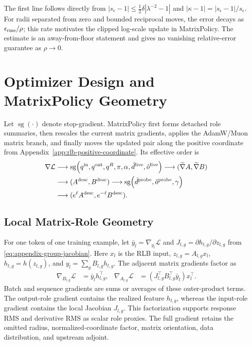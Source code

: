 \documentclass{article}
\begin{document}
The first line follows directly from
$|s_\epsilon-1|\le\tfrac12\delta|\lambda^{-2}-1|$ and
$|\kappa-1|=|s_\epsilon-1|/s_\epsilon$.  For radii separated from zero and
bounded reciprocal moves, the error decays as $\epsilon_{\rm rms}/\rho$; this
rate motivates the clipped log-scale update in MatrixPolicy.  The estimate is
an away-from-floor statement and gives no vanishing relative-error guarantee as
$\rho\to0$.

\section{Optimizer Design and MatrixPolicy Geometry}
\label{app:matrixpolicy-step}

Let $\operatorname{sg}(\cdot)$ denote stop-gradient.  MatrixPolicy first forms
detached role summaries, then rescales the current matrix gradients, applies the
AdamW/Muon matrix branch, and finally moves the updated pair along the positive
coordinate from Appendix~\ref{app:rlb-positive-coordinate}.  Its effective
order is
\begin{equation}
\begin{aligned}
    \nabla\mathcal L
    &\longrightarrow
    \operatorname{sg}\!\left(
    q^{\rm in},q^{\rm out},q^R,\pi,\alpha,
    \hat d^{\rm live},\hat o^{\rm live}
    \right)
    \longrightarrow
    (\widetilde\nabla A,\widetilde\nabla B)
    \\
    &\longrightarrow
    (A^{\rm desc},B^{\rm desc})
    \longrightarrow
    \operatorname{sg}\!\left(
    \hat d^{\rm probe},\hat o^{\rm probe},\gamma
    \right)
    \\
    &\longrightarrow
    (e^\ell A^{\rm desc},e^{-\ell}B^{\rm desc}).
\end{aligned}
    \label{eq:appendix-matrixpolicy-pipeline}
\end{equation}

\subsection{Local Matrix-Role Geometry}
\label{app:matrixpolicy-proxies}

For one token of one training example, let $\bar y_l=\nabla_{y_l}\mathcal{L}$ and
$J_{l,g}=\partial h_{l,g}/\partial z_{l,g}$ from
\eqref{eq:appendix-group-jacobian}.  Here $x_l$ is the RLB input,
$z_{l,g}=A_{l,g}x_l$, $h_{l,g}=h(z_{l,g})$, and
$y_l=\sum_g B_{l,g}h_{l,g}$.  The adjacent matrix gradients factor as
\begin{align}
    \nabla_{B_{l,g}}\mathcal{L}
    &=
    \bar y_l h_{l,g}^\top,
    &
    \nabla_{A_{l,g}}\mathcal{L}
    &=
    \left(J_{l,g}^\top B_{l,g}^\top\bar y_l\right)x_l^\top .
    \label{eq:appendix-matrix-gradients}
\end{align}
Batch and sequence gradients are sums or averages of these outer-product terms.
The output-role gradient contains the realized feature $h_{l,g}$, whereas the
input-role gradient contains the local Jacobian $J_{l,g}$.  This factorization
supports response RMS and derivative RMS as scalar role proxies.  The full
gradient retains the omitted radius, normalized-coordinate factor, matrix
orientation, data distribution, and upstream adjoint.
\end{document}
